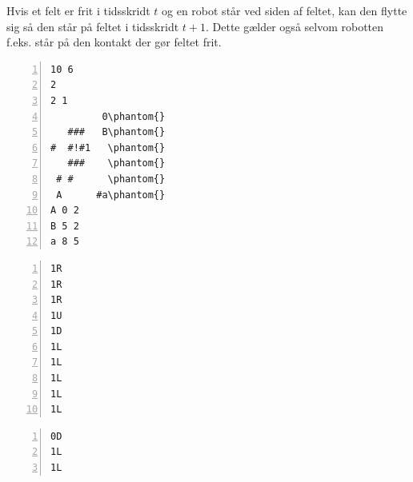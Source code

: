 \documentclass[10pt, a4paper]{article}
\begin{document}
Hvis et felt er frit i tidsskridt $t$ og en robot står ved siden af feltet, kan den flytte sig så den står på feltet i tidsskridt $t+1$.
Dette gælder også selvom robotten f.eks. står på den kontakt der gør feltet frit.

\newsavebox{\simpleboard}
\begin{lrbox}\simpleboard%
\hspace{1cm}
\begin{minipage}[b]{2.1cm}%
\begin{Verbatim}[frame=single, numbers=left, showspaces, commandchars=\\\{\}, baselinestretch=0.64]
10 6
2
2 1
         0\phantom{}
   ###   B\phantom{}
#  #!#1   \phantom{}
   ###    \phantom{}
 # #      \phantom{}
 A      #a\phantom{}
A 0 2
B 5 2
a 8 5
\end{Verbatim}
\end{minipage} 
\hspace{1cm}
\end{lrbox}

\newsavebox{\simpleboardsolution}
\begin{lrbox}\simpleboardsolution%
\hspace{1cm}
\begin{minipage}[b]{2.1cm}%
\begin{Verbatim}[frame=single, numbers=left,showspaces, commandchars=\\\{\}, baselinestretch=0.64, label={\scriptsize Løsning 1}]
1R
1R
1R
1U
1D
1L
1L
1L
1L
1L
\end{Verbatim}
\vspace{-4pt}
\begin{Verbatim}[frame=single, numbers=left,showspaces, commandchars=\\\{\}, baselinestretch=0.64, label={\scriptsize Løsning 2}]
0D
1L
1L
\end{Verbatim}
\end{minipage}
\hspace{1cm}
\end{lrbox}
\end{document}
